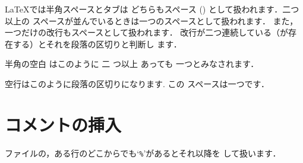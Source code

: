 %
%
{\LaTeX}では半角スペースとタブは
どちらもスペース () として扱われます．二つ以上の
スペースが並んでいるときは一つのスペースとして扱われます．%
%
また，一つだけの{改行}もスペースとして扱われます．
改行が二つ連続している（が存在する）とそれを段落の区切りと判断し
ます．


\begin{InOut}
半角の空白 はこのように  二  つ以上
あっても    一つとみなされます．

空行はこのように段落の区切りになります.
この              スペースは一つです．
\end{InOut}

\section{コメントの挿入}
ファイルの，ある行のどこからでも`\texttt{\%}'があるとそれ以降を
して扱います．%
%
